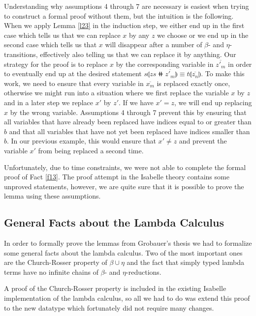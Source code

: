 Understanding why assumptions 4 through 7 are necessary is easiest when trying to construct a formal proof without them, but the intuition is the following. When we apply Lemma \ref{l23} in the induction step, we either end up in the first case which tells us that we can replace $x$ by any $z$ we choose or we end up in the second case which tells us that $x$ will disappear after a number of $\beta$- and $\eta$-transitions, effectively also telling us that we can replace it  by anything. Our strategy for the proof is to replace $x$ by the corresponding variable in $\overline{z'_m}$ in order to eventually end up at the desired statement $s \llparenthesis zs \doubleplus \overline{z'_m} \rrparenthesis \equiv t \llparenthesis \overline{z_n} \rrparenthesis$. To make this work, we need to ensure that every variable in $\overline{x_m}$ is replaced exactly once, otherwise we might run into a situation where we first replace the variable $x$ by $z$ and in a later step we replace $x'$ by $z'$. If we have $x' = z$, we will end up replacing $x$ by the wrong variable. Assumptions 4 through 7 prevent this by ensuring that all variables that have already been replaced have indices equal to or greater than $b$ and that all variables that have not yet been replaced have indices smaller than $b$. In our previous example, this would ensure that $x' \neq z$ and prevent the variable $x'$ from being replaced a second time.

Unfortunately, due to time constraints, we were not able to complete the formal proof of Fact \ref{f13}. The proof attempt in the Isabelle theory contains some unproved statements, however, we are quite sure that it is possible to prove the lemma using these assumptions.

\subsection{General Facts about the Lambda Calculus}

In order to formally prove the lemmas from Grobauer's thesis \cite{Grobauer} we had to formalize some general facts about the lambda calculus. Two of the most important ones are the Church-Rosser property of $\beta \cup \eta$ and the fact that simply typed lambda terms have no infinite chains of $\beta$- and $\eta$-reductions.

A proof of the Church-Rosser property is included in the existing Isabelle implementation of the lambda calculus, so all we had to do was extend this proof to the new datatype which fortunately did not require many changes.

